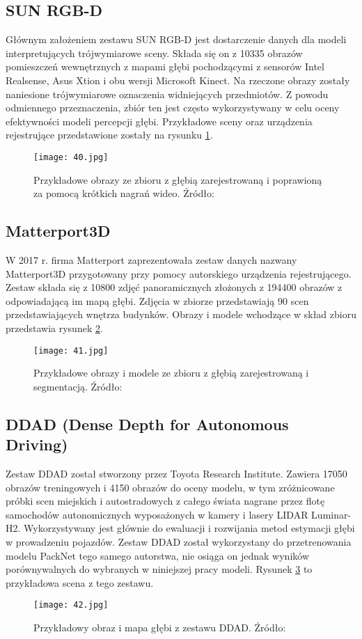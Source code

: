 \subsection{SUN RGB-D}
Głównym założeniem zestawu SUN RGB-D \cite{song2015} jest dostarczenie danych dla modeli interpretujących trójwymiarowe sceny. Składa się on z 10335 obrazów pomieszczeń wewnętrznych z mapami głębi pochodzącymi z sensorów Intel Realsense, Asus Xtion i obu wersji Microsoft Kinect. Na rzeczone obrazy zostały naniesione trójwymiarowe oznaczenia widniejących przedmiotów. Z powodu odmiennego przeznaczenia, zbiór ten jest często wykorzystywany w celu oceny efektywności modeli percepcji głębi. Przykładowe sceny oraz urządzenia rejestrujące przedstawione zostały na rysunku \ref{fig:sunrgbd-comparison}.
\begin{figure}[H]
    \centering
    \texttt{[image: 40.jpg]}
    \caption{Przykładowe obrazy ze zbioru z głębią zarejestrowaną i poprawioną za pomocą krótkich nagrań wideo. Źródło: \cite{song2015}}
    \label{fig:sunrgbd-comparison}
\end{figure}

\subsection{Matterport3D}
W 2017 r. firma Matterport zaprezentowała zestaw danych nazwany Matterport3D \cite{chang2017} przygotowany przy pomocy autorskiego urządzenia rejestrującego. Zestaw składa się z 10800 zdjęć panoramicznych złożonych z 194400 obrazów z odpowiadającą im mapą głębi. Zdjęcia w zbiorze przedstawiają 90 scen przedstawiających wnętrza budynków. Obrazy i modele wchodzące w skład zbioru przedstawia rysunek \ref{fig:matterport3d-example}.
\begin{figure}[H]
    \centering
    \texttt{[image: 41.jpg]}
    \caption{Przykładowe obrazy i modele ze zbioru z głębią zarejestrowaną i segmentacją. Źródło: \cite{chang2017}}
    \label{fig:matterport3d-example}
\end{figure} 

\subsection{DDAD (Dense Depth for Autonomous Driving)}
Zestaw DDAD \cite{guizilini2020} został stworzony przez Toyota Research Institute. Zawiera 17050 obrazów treningowych i 4150 obrazów do oceny modelu, w tym zróżnicowane próbki scen miejskich i autostradowych z całego świata nagrane przez flotę samochodów autonomicznych wyposażonych w kamery i lasery LIDAR Luminar-H2. Wykorzystywany jest głównie do ewaluacji i rozwijania metod estymacji głębi w prowadzeniu pojazdów. Zestaw DDAD został wykorzystany do przetrenowania modelu PackNet tego samego autorstwa, nie osiąga on jednak wyników porównywalnych do wybranych w niniejszej pracy modeli.
Rysunek \ref{fig:ddad-example} to przykładowa scena z tego zestawu.
\begin{figure}[H]
    \centering
    \texttt{[image: 42.jpg]}
    \caption{Przykładowy obraz i mapa głębi z zestawu DDAD. Źródło: \cite{guizilini2020}}
    \label{fig:ddad-example}
\end{figure} 

